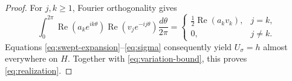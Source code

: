 \documentclass[10pt,a4paper]{amsart}
\DeclareMathOperator{\Rea}{Re}
\begin{document}
\begin{proof}
For $j,k\ge1$, Fourier orthogonality gives
\[
 \int_0^{2\pi}\Rea(a_ke^{ik\theta})
            \Rea(v_je^{-ij\theta})\frac{d\theta}{2\pi}
 =\begin{cases}
   \tfrac12\Rea(a_kv_k),&j=k,\\
   0,&j\ne k.
  \end{cases}
\]
Equations \eqref{eq:swept-expansion}--\eqref{eq:sigma} consequently
yield $U_\sigma=h$ almost everywhere on $H$. Together with
\eqref{eq:variation-bound}, this proves \eqref{eq:realization}.
\end{proof}
\end{document}
